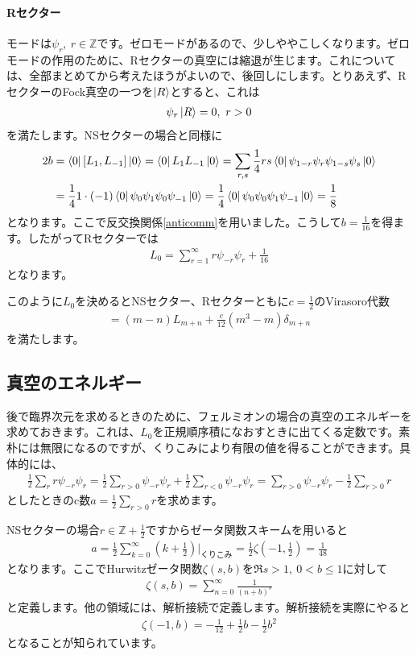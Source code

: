 \documentclass[report,paper=a4, fontsize=12pt, line_length=16cm, number_of_lines=33,dvipdfmx]{jlreq}
\numberwithin{equation}{chapter}
\numberwithin{equation}{section}
\newcommand{\Zb}{\mathbb{Z}}
\begin{document}
\paragraph{Rセクター}
モードは$\psi_{r},\ r\in \Zb$です。ゼロモードがあるので、少しややこしくなります。ゼロモードの作用のために、Rセクターの真空には縮退が生じます。これについては、全部まとめてから考えたほうがよいので、後回しにします。とりあえず、RセクターのFock真空の一つを$\ket{R}$とすると、これは
\begin{align}
  \psi_{r}\ket{R}=0,\ r>0
\end{align}
を満たします。NSセクターの場合と同様に
\begin{align}
  2b&=\bra{0}[L_{1},L_{-1}]\ket{0}
  =\bra{0}L_{1}L_{-1}\ket{0}
  =\sum_{r,s}\frac14rs\bra{0}\psi_{1-r}\psi_{r}\psi_{1-s}\psi_{s}\ket{0}\nonumber\\
  &
  =\frac14 1\cdot (-1)\bra{0}\psi_{0}\psi_{1}\psi_{0}\psi_{-1}\ket{0}
  =\frac14 \bra{0}\psi_{0}\psi_{0}\psi_{1}\psi_{-1}\ket{0}
  =\frac{1}{8}
\end{align}
となります。ここで反交換関係\eqref{anticomm}を用いました。こうして$b=\frac{1}{16}$を得ます。したがってRセクターでは
\begin{align}
  L_0=\sum_{r=1}^{\infty} r\psi_{-r}\psi_{r}
  +\frac{1}{16}
\end{align}
となります。

このように$L_0$を決めるとNSセクター、Rセクターともに$c=\frac12$のVirasoro代数
\begin{align}
  [L_m,L_n]=(m-n)L_{m+n}+\frac{c}{12}(m^3-m)\delta_{m+n}
\end{align}
を満たします。

\subsection{真空のエネルギー}
後で臨界次元を求めるときのために、フェルミオンの場合の真空のエネルギーを求めておきます。これは、$L_0$を正規順序積になおすときに出てくる定数です。素朴には無限になるのですが、くりこみにより有限の値を得ることができます。具体的には、
\begin{align}
  \frac12\sum_{r}r\psi_{-r}\psi_{r}
  =
  \frac 12 \sum_{r>0}\psi_{-r}\psi_{r}
  +  \frac 12 \sum_{r<0}\psi_{-r}\psi_{r}
  =\sum_{r>0}\psi_{-r}\psi_{r}-\frac12 \sum_{r>0}r
\end{align}
としたときのc数$a=\frac12 \sum_{r>0}r$を求めます。

NSセクターの場合$r\in \Zb+\frac12$ですからゼータ関数スキームを用いると
\begin{align}
 a=\frac12 \sum_{k=0}^{\infty}(k+\frac12)\Bigg|_{\text{くりこみ}}=\frac12 \zeta(-1,\frac12)=
 \frac{1}{48}
\end{align}
となります。ここでHurwitzゼータ関数$\zeta(s,b)$を$\Re s >1,\ 0< b \le 1$に対して
\begin{align}
  \zeta(s,b)=\sum_{n=0}^{\infty}\frac{1}{(n+b)^s}
\end{align}
と定義します。他の領域には、解析接続で定義します。解析接続を実際にやると
\begin{align}
  \zeta(-1,b)=-\frac{1}{12}+\frac12 b -\frac12 b^2
\end{align}
となることが知られています。
\end{document}
